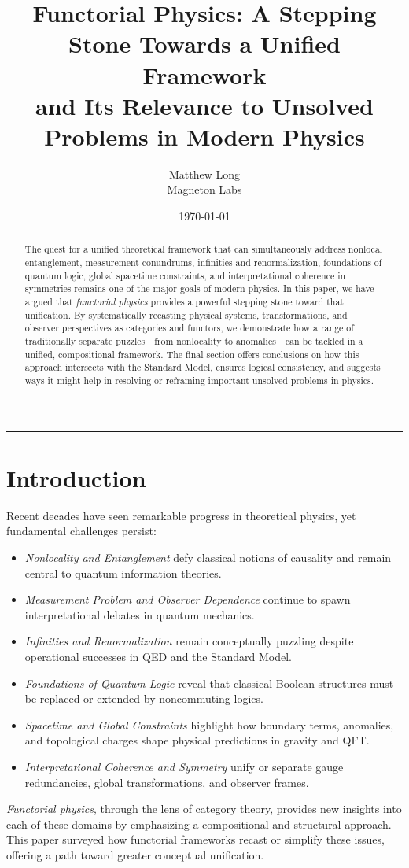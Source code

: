 \documentclass[12pt]{article}
\title{\bf Functorial Physics: A Stepping Stone Towards a Unified Framework \\
\large and Its Relevance to Unsolved Problems in Modern Physics}
\author{Matthew Long \\
Magneton Labs}
\date{\today}
\begin{document}
\maketitle

\begin{abstract}
The quest for a unified theoretical framework that can simultaneously address nonlocal entanglement, measurement conundrums, infinities and renormalization, foundations of quantum logic, global spacetime constraints, and interpretational coherence in symmetries remains one of the major goals of modern physics. In this paper, we have argued that {\it functorial physics} provides a powerful stepping stone toward that unification. By systematically recasting physical systems, transformations, and observer perspectives as categories and functors, we demonstrate how a range of traditionally separate puzzles---from nonlocality to anomalies---can be tackled in a unified, compositional framework. The final section offers conclusions on how this approach intersects with the Standard Model, ensures logical consistency, and suggests ways it might help in resolving or reframing important unsolved problems in physics.
\end{abstract}

\vspace{1em}
\hrule
\vspace{1em}

\section{Introduction}
Recent decades have seen remarkable progress in theoretical physics, yet fundamental challenges persist:
\begin{itemize}[label=$\bullet$]
\item \emph{Nonlocality and Entanglement} defy classical notions of causality and remain central to quantum information theories.
\item \emph{Measurement Problem and Observer Dependence} continue to spawn interpretational debates in quantum mechanics.
\item \emph{Infinities and Renormalization} remain conceptually puzzling despite operational successes in QED and the Standard Model.
\item \emph{Foundations of Quantum Logic} reveal that classical Boolean structures must be replaced or extended by noncommuting logics.
\item \emph{Spacetime and Global Constraints} highlight how boundary terms, anomalies, and topological charges shape physical predictions in gravity and QFT.
\item \emph{Interpretational Coherence and Symmetry} unify or separate gauge redundancies, global transformations, and observer frames.
\end{itemize}
{\it Functorial physics}, through the lens of category theory, provides new insights into each of these domains by emphasizing a compositional and structural approach. This paper surveyed how functorial frameworks recast or simplify these issues, offering a path toward greater conceptual unification.
\end{document}
